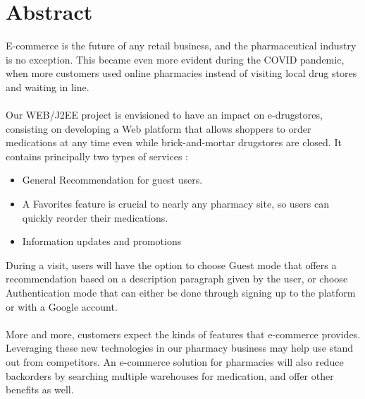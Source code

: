 
\newpage
\chapter*{Abstract}
\begin{spacing}{1}
\vspace{1cm}
E-commerce is the future of any retail business, and the pharmaceutical industry is no exception. This became even more evident during the COVID pandemic, when more customers used online pharmacies instead of visiting local drug stores and waiting in line.
\\ \\
Our WEB/J2EE project is envisioned to have an impact on e-drugstores, consisting on developing a Web platform that allows shoppers to order medications at any time even while brick-and-mortar drugstores are closed. It contains principally two types of services :
\vspace{.3cm}
\begin{itemize}
\item General Recommendation for guest users.
\item A Favorites feature is crucial to nearly any pharmacy site, so users can quickly reorder their medications.
\item Information updates and promotions
\end{itemize}
\vspace{.3cm}
During a visit, users will have the option to choose Guest mode that offers a recommendation based on a description paragraph given by the user, or choose Authentication mode that can either be done through signing up to the platform or with a Google account.
\\ \\
More and more, customers expect the kinds of features that e-commerce provides. Leveraging these new technologies in our pharmacy business may help use stand out from competitors. An e-commerce solution for pharmacies will also reduce backorders by searching multiple warehouses for medication, and offer other benefits as well.


\end{spacing}

